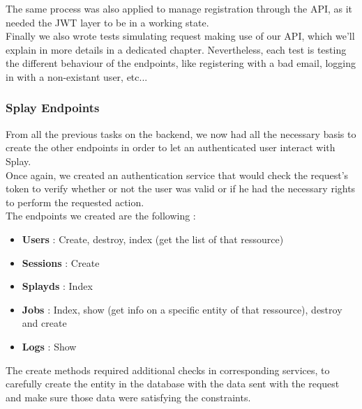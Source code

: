 \documentclass{eplmastersthesis}
\begin{document}
          The same process was also applied to manage registration through
          the API, as it needed the JWT layer to be in a working state.\\

          Finally we also wrote tests simulating request making use of our
          API, which we'll explain in more details in a dedicated chapter.
          Nevertheless, each test is testing the different behaviour of
          the endpoints, like registering with a bad email, logging in with
          a non-existant user, etc...

        \subsubsection{Splay Endpoints}

          From all the previous tasks on the backend, we now had all the
          necessary basis to create the other endpoints in order to let
          an authenticated user interact with Splay.\\

          Once again, we created an authentication service that would check
          the request's token to verify whether or not the user was valid or
          if he had the necessary rights to perform the requested action.\\

          The endpoints we created are the following :

          \begin{itemize}
            \item \textbf{Users} : Create, destroy, index (get the list of that
            ressource)
            \item \textbf{Sessions} : Create
            \item \textbf{Splayds} : Index
            \item \textbf{Jobs} : Index, show (get info on a specific entity
            of that ressource), destroy and create
            \item \textbf{Logs} : Show
          \end{itemize}

          The create methods required additional checks in corresponding
          services, to carefully create the entity in the database with
          the data sent with the request and make sure those data were
          satisfying the constraints.\\
\end{document}

